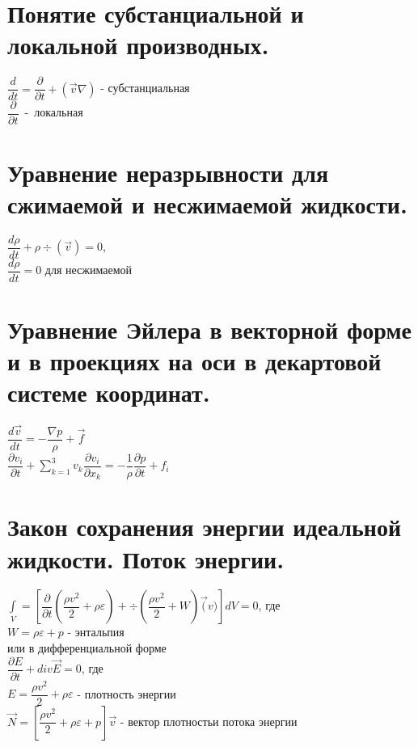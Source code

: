 


\newcommand{\sumk}{\sum\limits_{k=1}^3v_k}


	\small
	\begin{multicols*}{4}
		\section{Понятие субстанциальной и локальной производных.}
		$\dfrac{d}{dt}=\dfrac{\partial}{\partial t}+(\vec{v}\nabla)$ - субстанциальная \\
		$\dfrac{\partial}{\partial t}$~-~локальная
		
		\section{Уравнение неразрывности для сжимаемой и несжимаемой жидкости.}
		$\dfrac{d\rho}{dt}+\rho \div(\vec{v})=0$, \\
		$\dfrac{d\rho}{dt}=0$ для несжимаемой 
		
		\section{Уравнение Эйлера в векторной форме и в проекциях на оси в декартовой системе координат.}
		$\dfrac{d\vec{v}}{dt}=-\dfrac{\nabla p}{\rho}+\vec{f}$ \\
		$\dfrac{\partial v_i}{\partial t}+\sumk\dfrac{\partial v_i}{\partial x_k}=-\dfrac{1}{\rho}\dfrac{\partial p}{\partial t}+f_i$
		
		\section{Закон сохранения энергии идеальной жидкости. Поток энергии.}
		$\int\limits_V=\left[\dfrac{\partial}{\partial t}(\dfrac{\rho v^2}{2}+\rho\varepsilon)+\div(\dfrac{\rho v^2}{2}+W)\vec(v)\right]dV=0$, где\\
		$W=\rho\varepsilon+p$ - энтальпия \\
		или в дифференциальной форме \\
		$\dfrac{\partial E}{\partial t}+div\vec{E}=0$, где \\
		$E=\dfrac{\rho v^2}{2}+\rho\varepsilon$ - плотность энергии \\
		$\vec{N}=\left[\dfrac{\rho v^2}{2}+\rho\varepsilon+p\right]\vec{v}$ - вектор плотностьи потока энергии
		

\end{multicols*}
